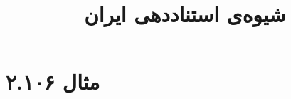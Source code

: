 \documentclass[a4paper,10pt]{article}
\begin{document}
\title{شیوه‌ی استناددهی ایران}
\author{}
\date{}
\maketitle



\section*{مثال ۲.۱۰۶}

\cite{حقایق1377}\\
\\
\cite{مددی1385}\\
\\






\end{document}
